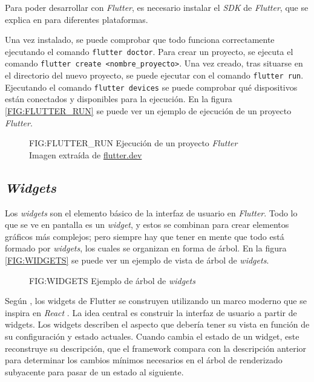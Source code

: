 Para poder desarrollar con \textit{Flutter}, es necesario instalar el \textit{SDK} de 
\textit{Flutter}, que se explica en \cite{flutter_install} para diferentes plataformas.

Una vez instalado, se puede comprobar que todo funciona correctamente ejecutando el comando 
\texttt{flutter doctor}. Para crear un proyecto, se ejecuta el comando \texttt{flutter create <nombre\_proyecto>}.
Una vez creado, tras situarse en el directorio del nuevo proyecto, se puede ejecutar
con el comando \texttt{flutter run}. Ejecutando el comando \texttt{flutter devices} se puede
comprobar qué dispositivos están conectados y disponibles para la ejecución. En la figura \ref{FIG:FLUTTER_RUN} 
se puede ver un ejemplo de ejecución de un proyecto \textit{Flutter}.

\begin{figure}[Ejecución de un proyecto \textit{Flutter}]{FIG:FLUTTER_RUN}
  {Ejecución de un proyecto \textit{Flutter} \\
   \footnotesize{
    Imagen extraída de \href{
      https://docs.flutter.dev/get-started/test-drive?tab=terminal
    }{flutter.dev}
    }
  }
\end{figure}


\subsection{\textit{Widgets}\label{SEC:WIDGETS}}

Los \textit{widgets} son el elemento básico de la interfaz de usuario en \textit{Flutter}. Todo lo que se ve
en pantalla es un \textit{widget}, y estos se combinan para crear elementos gráficos más complejos; pero 
siempre hay que tener en mente que todo está formado por \textit{widgets}, los cuales se organizan en forma de
árbol. En la figura \ref{FIG:WIDGETS} se puede ver un ejemplo de vista de árbol de \textit{widgets}.

\begin{figure}[Ejemplo de árbol de \textit{widgets}]{FIG:WIDGETS}
  {Ejemplo de árbol de \textit{widgets}}
\end{figure}

Según \cite{flutter_ui}, los widgets de Flutter se construyen utilizando un marco moderno que se inspira en \textit{React} \cite{react}. 
La idea central es construir la interfaz de usuario a partir de widgets. Los widgets describen el aspecto que debería 
tener su vista en función de su configuración y estado actuales. Cuando cambia el estado de un widget, este reconstruye 
su descripción, que el framework compara con la descripción anterior para determinar los cambios mínimos necesarios en el 
árbol de renderizado subyacente para pasar de un estado al siguiente.

